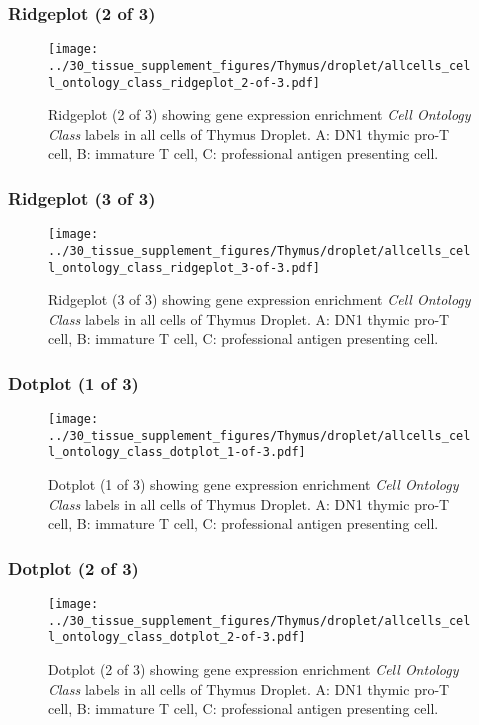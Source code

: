 \clearpage

\subsubsection{Ridgeplot (2 of 3)}
\begin{figure}[h]
\centering
\texttt{[image: ../30\_tissue\_supplement\_figures/Thymus/droplet/allcells\_cell\_ontology\_class\_ridgeplot\_2-of-3.pdf]}

\caption{ Ridgeplot (2 of 3)  showing gene expression enrichment \emph{Cell Ontology Class} labels in all cells of Thymus Droplet. A: DN1 thymic pro-T cell, B: immature T cell, C: professional antigen presenting cell.}
\end{figure}


\clearpage

\subsubsection{Ridgeplot (3 of 3)}
\begin{figure}[h]
\centering
\texttt{[image: ../30\_tissue\_supplement\_figures/Thymus/droplet/allcells\_cell\_ontology\_class\_ridgeplot\_3-of-3.pdf]}

\caption{ Ridgeplot (3 of 3)  showing gene expression enrichment \emph{Cell Ontology Class} labels in all cells of Thymus Droplet. A: DN1 thymic pro-T cell, B: immature T cell, C: professional antigen presenting cell.}
\end{figure}


\clearpage

\subsubsection{Dotplot (1 of 3)}
\begin{figure}[h]
\centering
\texttt{[image: ../30\_tissue\_supplement\_figures/Thymus/droplet/allcells\_cell\_ontology\_class\_dotplot\_1-of-3.pdf]}

\caption{ Dotplot (1 of 3)  showing gene expression enrichment \emph{Cell Ontology Class} labels in all cells of Thymus Droplet. A: DN1 thymic pro-T cell, B: immature T cell, C: professional antigen presenting cell.}
\end{figure}


\clearpage

\subsubsection{Dotplot (2 of 3)}
\begin{figure}[h]
\centering
\texttt{[image: ../30\_tissue\_supplement\_figures/Thymus/droplet/allcells\_cell\_ontology\_class\_dotplot\_2-of-3.pdf]}

\caption{ Dotplot (2 of 3)  showing gene expression enrichment \emph{Cell Ontology Class} labels in all cells of Thymus Droplet. A: DN1 thymic pro-T cell, B: immature T cell, C: professional antigen presenting cell.}
\end{figure}


